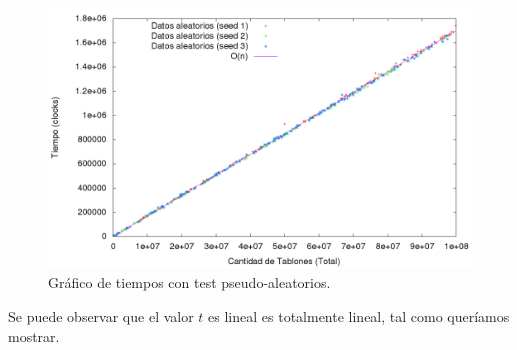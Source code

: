 \begin{figure}[h]
\begin{center}
\includegraphics[scale=0.4]{./imagenes/ej1_chartRendimiento.png}
\caption{Gr\'afico de tiempos con test pseudo-aleatorios.}
\end{center}
\end{figure}

Se puede observar que el valor $t$ es lineal es totalmente lineal, tal como queríamos mostrar.
